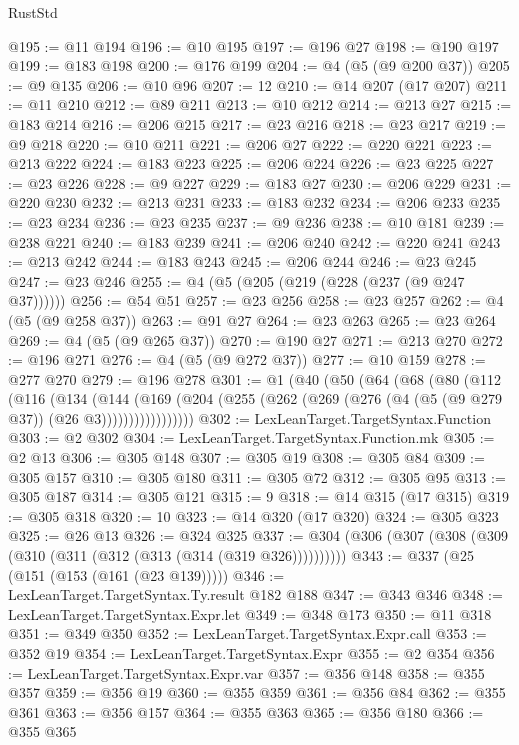 \begin{lexlean}{RustStd}
\begin{coremodule}
@195 := @11 @194
@196 := @10 @195
@197 := @196 @27
@198 := @190 @197
@199 := @183 @198
@200 := @176 @199
@204 := @4 (@5 (@9 @200 @37))
@205 := @9 @135
@206 := @10 @96
@207 := 12
@210 := @14 @207 (@17 @207)
@211 := @11 @210
@212 := @89 @211
@213 := @10 @212
@214 := @213 @27
@215 := @183 @214
@216 := @206 @215
@217 := @23 @216
@218 := @23 @217
@219 := @9 @218
@220 := @10 @211
@221 := @206 @27
@222 := @220 @221
@223 := @213 @222
@224 := @183 @223
@225 := @206 @224
@226 := @23 @225
@227 := @23 @226
@228 := @9 @227
@229 := @183 @27
@230 := @206 @229
@231 := @220 @230
@232 := @213 @231
@233 := @183 @232
@234 := @206 @233
@235 := @23 @234
@236 := @23 @235
@237 := @9 @236
@238 := @10 @181
@239 := @238 @221
@240 := @183 @239
@241 := @206 @240
@242 := @220 @241
@243 := @213 @242
@244 := @183 @243
@245 := @206 @244
@246 := @23 @245
@247 := @23 @246
@255 := @4 (@5 (@205 (@219 (@228 (@237 (@9 @247 @37))))))
@256 := @54 @51
@257 := @23 @256
@258 := @23 @257
@262 := @4 (@5 (@9 @258 @37))
@263 := @91 @27
@264 := @23 @263
@265 := @23 @264
@269 := @4 (@5 (@9 @265 @37))
@270 := @190 @27
@271 := @213 @270
@272 := @196 @271
@276 := @4 (@5 (@9 @272 @37))
@277 := @10 @159
@278 := @277 @270
@279 := @196 @278
@301 := @1
    (@40
      (@50
        (@64
          (@68
            (@80
              (@112
                (@116
                  (@134
                    (@144
                      (@169
                        (@204
                          (@255 (@262 (@269 (@276 (@4 (@5 (@9 @279 @37)) (@26 @3)))))))))))))))))
@302 := LexLeanTarget.TargetSyntax.Function
@303 := @2 @302
@304 := LexLeanTarget.TargetSyntax.Function.mk
@305 := @2 @13
@306 := @305 @148
@307 := @305 @19
@308 := @305 @84
@309 := @305 @157
@310 := @305 @180
@311 := @305 @72
@312 := @305 @95
@313 := @305 @187
@314 := @305 @121
@315 := 9
@318 := @14 @315 (@17 @315)
@319 := @305 @318
@320 := 10
@323 := @14 @320 (@17 @320)
@324 := @305 @323
@325 := @26 @13
@326 := @324 @325
@337 := @304 (@306 (@307 (@308 (@309 (@310 (@311 (@312 (@313 (@314 (@319 @326))))))))))
@343 := @337 (@25 (@151 (@153 (@161 (@23 @139)))))
@346 := LexLeanTarget.TargetSyntax.Ty.result @182 @188
@347 := @343 @346
@348 := LexLeanTarget.TargetSyntax.Expr.let
@349 := @348 @173
@350 := @11 @318
@351 := @349 @350
@352 := LexLeanTarget.TargetSyntax.Expr.call
@353 := @352 @19
@354 := LexLeanTarget.TargetSyntax.Expr
@355 := @2 @354
@356 := LexLeanTarget.TargetSyntax.Expr.var
@357 := @356 @148
@358 := @355 @357
@359 := @356 @19
@360 := @355 @359
@361 := @356 @84
@362 := @355 @361
@363 := @356 @157
@364 := @355 @363
@365 := @356 @180
@366 := @355 @365

\end{coremodule}
\end{lexlean}
